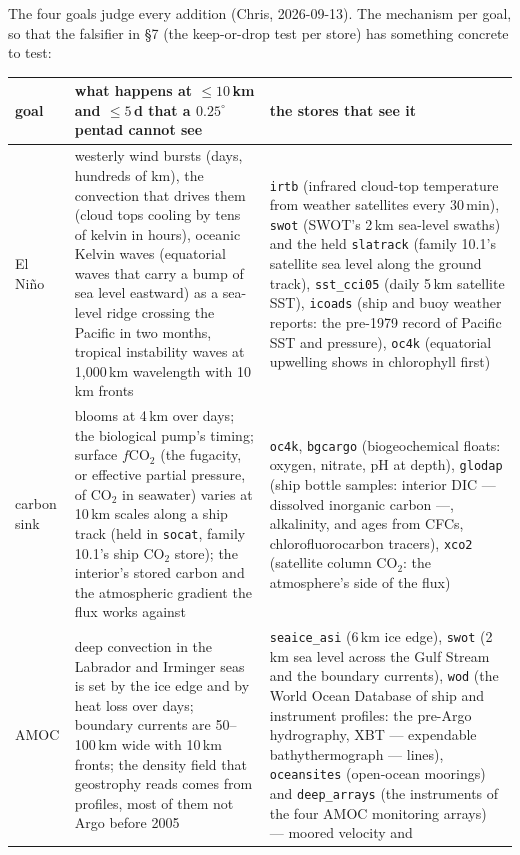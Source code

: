 \documentclass[10pt]{article}
\newcommand{\code}[1]{\texttt{#1}}
\begin{document}
The four goals judge every addition (Chris, 2026-09-13). The mechanism per
goal, so that the falsifier in \S7 (the keep-or-drop test per store) has something concrete to test:

\begin{table}[h]
\centering\setlength{\tabcolsep}{4pt}\footnotesize
\begin{tabular}{@{}L{2.2cm}L{6.3cm}L{6.3cm}@{}}
\toprule
goal & what happens at $\le 10$\,km and $\le 5$\,d that a $0.25^\circ$ pentad cannot see & the stores that see it \\
\midrule
El Ni\~no & westerly wind bursts (days, hundreds of km), the convection that
drives them (cloud tops cooling by tens of kelvin in hours), oceanic Kelvin
waves (equatorial waves that carry a bump of sea level eastward) as a sea-level ridge crossing the Pacific in two months, tropical
instability waves at 1,000\,km wavelength with 10\,km fronts &
\code{irtb} (infrared cloud-top temperature from weather satellites every 30\,min), \code{swot} (SWOT's 2\,km sea-level swaths) and the held
\code{slatrack} (family 10.1's satellite sea level along the ground track), \code{sst\_cci05} (daily 5\,km satellite SST), \code{icoads} (ship and buoy weather reports: the pre-1979 record of
Pacific SST and pressure), \code{oc4k} (equatorial upwelling shows in
chlorophyll first) \\
\addlinespace
carbon sink & blooms at 4\,km over days; the biological pump's timing;
surface $f$CO$_2$ (the fugacity, or effective partial pressure, of CO$_2$ in seawater) varies at 10\,km scales along a ship track (held in
\code{socat}, family 10.1's ship CO$_2$ store); the interior's stored carbon and the atmospheric gradient the
flux works against &
\code{oc4k}, \code{bgcargo} (biogeochemical floats: oxygen, nitrate, pH at depth), \code{glodap}
(ship bottle samples: interior DIC --- dissolved inorganic carbon ---, alkalinity, and ages from CFCs, chlorofluorocarbon tracers), \code{xco2} (satellite column CO$_2$: the atmosphere's side of
the flux) \\
\addlinespace
AMOC & deep convection in the Labrador and Irminger seas is set by the ice
edge and by heat loss over days; boundary currents are 50--100\,km wide with
10\,km fronts; the density field that geostrophy reads comes from profiles,
most of them not Argo before 2005 &
\code{seaice\_asi} (6\,km ice edge), \code{swot} (2\,km sea level across the
Gulf Stream and the boundary currents), \code{wod} (the World Ocean Database of ship and instrument profiles: the pre-Argo hydrography,
XBT --- expendable bathythermograph --- lines), \code{oceansites} (open-ocean moorings) and \code{deep\_arrays} (the instruments of the four AMOC monitoring arrays) --- moored velocity and

\end{tabular}
\end{table}
\end{document}

